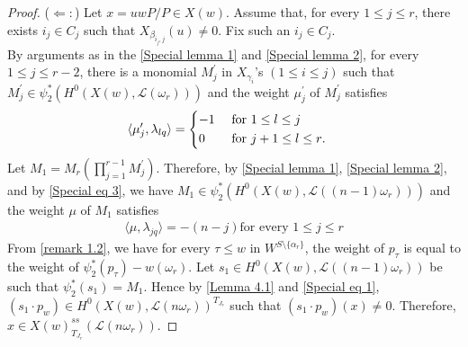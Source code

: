 \documentclass[12pt,reqno]{amsart}
\numberwithin{equation}{section}
\theoremstyle{definition}
\begin{document}
\begin{proof}
	($\Leftarrow:$) Let $x=uwP/P\in X(w)$. Assume that, for every $1\leq j\leq r$, there exists $i_{j}\in C_{j}$  such that $X_{\beta_{i_{j},j}}(u)\neq 0$. Fix such an $i_{j}\in C_{j}$.\\
		By arguments as in the \cref{Special lemma 1} and \cref{Special lemma 2}, for every $1\leq j\leq r-2$, there is a monomial $M^{\prime}_{j}$ in $X_{\gamma_{i}}$'s $(1\leq i\leq j)$ such that $M^{\prime}_{j}\in \psi_{2}^{*}(H^{0}(X(w),\mathcal{L}(\omega_{r})))$ and the weight $\mu^{\prime}_{j}$ of $M^{\prime}_{j}$ satisfies
		\begin{align}\label{Special eq 3}
			\langle\mu^{\prime}_{j},\lambda_{lq}\rangle&=\begin{dcases}
				-1&\text{ for $1\leq l\leq j$}\\
				0&\text{ for $j+1\leq l\leq r$}. 
			\end{dcases}
		\end{align}
	Let $M_{1}=M_{r}(\prod_{j=1}^{r-1}M^{\prime}_{j})$. Therefore, by \cref{Special lemma 1}, \cref{Special lemma 2}, and by \cref{Special eq 3}, we have $M_{1}\in\psi_{2}^{*}(H^{0}(X(w),\mathcal{L}((n-1)\omega_{r})))$ and the weight $\mu$ of $M_{1}$ satisfies 
	\begin{align}\label{Special eq 1}
		\langle\mu,\lambda_{jq}\rangle=-(n-j) \text{for every $1\leq j\leq r$}
	\end{align}
From \cref{remark 1.2}, we have for every $\tau\leq w$ in $W^{S\setminus\{\alpha_{r}\}}$, the weight of $p_{\tau}$ is equal to the weight of $\psi_{2}^{*}(p_{\tau})-w(\omega_{r})$. Let $s_{1}\in H^{0}(X(w),\mathcal{L}((n-1)\omega_{r}))$ be such that $\psi_{2}^{*}(s_{1})=M_{1}$. Hence by \cref{Lemma 4.1} and \cref{Special eq 1}, $(s_{1}\cdot p_{w})\in H^{0}(X(w),\mathcal{L}(n\omega_{r}))^{T_{J_{r}}}$ such that $(s_{1}\cdot p_{w})(x)\neq 0$. Therefore, $x\in X(w)^{ss}_{T_{J_{r}}}(\mathcal{L}(n\omega_{r}))$.

\end{proof}
\end{document}
